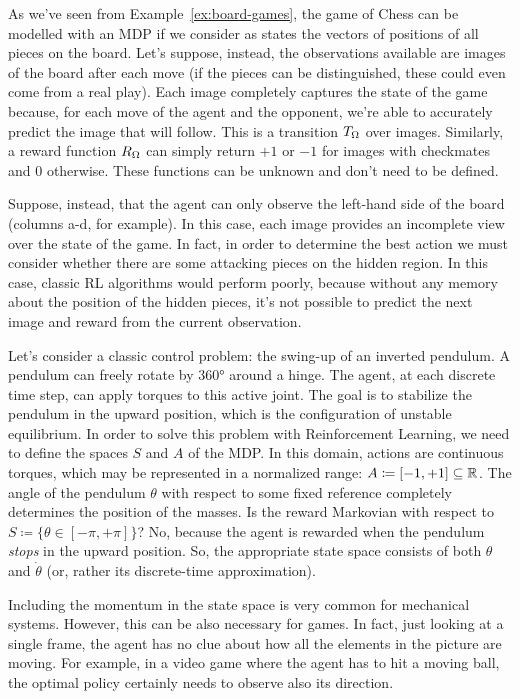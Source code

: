 \begin{example}
	As we've seen from Example~\vref{ex:board-games}, the game of Chess can
	be modelled with an MDP if we consider as states the vectors of positions of
	all pieces on the board. Let's suppose, instead, the observations available
	are images of the board after each move (if the pieces can be distinguished,
	these could even come from a real play). Each image completely captures the
	state of the game because, for each move of the agent and the opponent,
	we're able to accurately predict the image that will follow. This is a
	transition $T_\Omega$ over images. Similarly, a reward function $R_\Omega$ can
	simply return $+1$ or $-1$ for images with checkmates and 0 otherwise. These
	functions can be unknown and don't need to be defined.

	Suppose, instead, that the agent can only observe the left-hand side of the
	board (columns a-d, for example). In this case, each image provides an
	incomplete view over the state of the game. In fact, in order to determine
	the best action we must consider whether there are some attacking pieces on
	the hidden region. In this case, classic RL algorithms would perform poorly,
	because without any memory about the position of the hidden pieces, 
	it's not possible to predict the next image and reward from the current
	observation.
	\label{ex:chess-partial-obs}
\end{example}

\begin{example}
	Let's consider a classic control problem: the swing-up of an inverted
	pendulum. A pendulum can freely rotate by 360° around a hinge. The agent, at
	each discrete time step, can apply torques to this active joint.  The goal
	is to stabilize the pendulum in the upward position, which is the
	configuration of unstable equilibrium. In order to solve this problem with
	Reinforcement Learning, we need to define the spaces $S$ and $A$ of the MDP.
	In this domain, actions are continuous torques, which may be represented in
	a normalized range: $A \coloneqq [-1, +1] \subseteq \mathbb{R}$. The angle of the
	pendulum $\theta$ with respect to some fixed reference completely determines
	the position of the masses. Is the reward Markovian with respect to $S
	\coloneqq \{\theta \in [-\pi, +\pi]\}$? No, because the agent is rewarded
	when the pendulum \emph{stops} in the upward position. So, the appropriate
	state space consists of both $\theta$ and $\dot\theta$ (or, rather its
	discrete-time approximation).

	Including the momentum in the state space is very common for mechanical
	systems. However, this can be also necessary for games. In fact, just
	looking at a single frame, the agent has no clue about how all the elements
	in the picture are moving.  For example, in a video game where the agent has
	to hit a moving ball, the optimal policy certainly needs to observe also its
	direction.
	\label{ex:motion}
\end{example}


